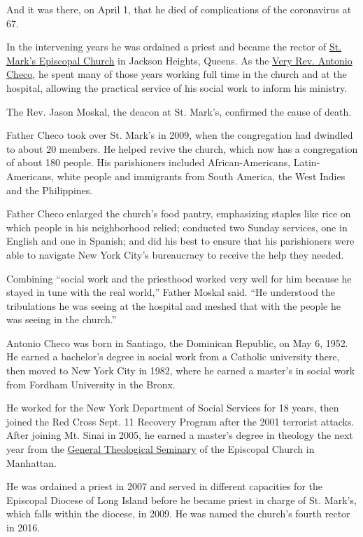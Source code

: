 And it was there, on April 1, that he died of complications of the
coronavirus at 67.

In the intervening years he was ordained a priest and became the rector
of \href{http://saintmarks.net/}{St. Mark's Episcopal Church} in Jackson
Heights, Queens. As the
\href{https://www.diolicovid19.info/antonio-checo.html}{Very Rev.
Antonio Checo}, he spent many of those years working full time in the
church and at the hospital, allowing the practical service of his social
work to inform his ministry.

The Rev. Jason Moskal, the deacon at St. Mark's, confirmed the cause of
death.

Father Checo took over St. Mark's in 2009, when the congregation had
dwindled to about 20 members. He helped revive the church, which now has
a congregation of about 180 people. His parishioners included
African-Americans, Latin-Americans, white people and immigrants from
South America, the West Indies and the Philippines.

Father Checo enlarged the church's food pantry, emphasizing staples like
rice on which people in his neighborhood relied; conducted two Sunday
services, one in English and one in Spanish; and did his best to ensure
that his parishioners were able to navigate New York City's bureaucracy
to receive the help they needed.

Combining ``social work and the priesthood worked very well for him
because he stayed in tune with the real world,'' Father Moskal said.
``He understood the tribulations he was seeing at the hospital and
meshed that with the people he was seeing in the church.''

Antonio Checo was born in Santiago, the Dominican Republic, on May 6,
1952. He earned a bachelor's degree in social work from a Catholic
university there, then moved to New York City in 1982, where he earned a
master's in social work from Fordham University in the Bronx.

He worked for the New York Department of Social Services for 18 years,
then joined the Red Cross Sept. 11 Recovery Program after the 2001
terrorist attacks. After joining Mt. Sinai in 2005, he earned a master's
degree in theology the next year from the \href{http://gts.edu/}{General
Theological Seminary} of the Episcopal Church in Manhattan.

He was ordained a priest in 2007 and served in different capacities for
the Episcopal Diocese of Long Island before he became priest in charge
of St. Mark's, which falls within the diocese, in 2009. He was named the
church's fourth rector in 2016.


